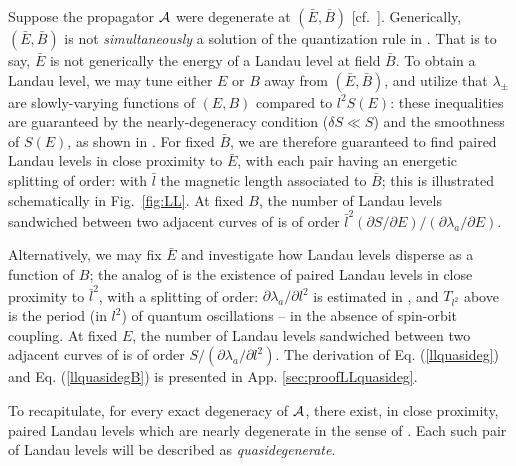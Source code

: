\documentclass[aps, showpacs, twocolumn, notitlepage, superscriptaddress]{revtex4-1}
\begin{document}
Suppose the propagator ${\cal A}$ were degenerate at $(\bar{E},\bar{B})$ [cf.\ ]. Generically, $(\bar{E},\bar{B})$ is not \emph{simultaneously} a solution of the quantization rule in .  
That is to say, $\bar{E}$ is not generically the energy of a Landau level at field $\bar{B}$. To obtain a Landau level, we may tune either $E$ or $B$   away from $(\bar{E},\bar{B})$, and  utilize that  $\lambda_{\pm}$ are slowly-varying functions of $(E,B)$ compared to $l^2S(E)$:
these inequalities are guaranteed by the nearly-degeneracy condition ($\delta S{\ll}S$) and the smoothness of $S(E)$, as shown in .  For fixed $\bar{B}$, we are therefore guaranteed to find paired Landau levels  in close proximity to $\bar{E}$, with each pair having an energetic splitting of order:
with $\bar{l}$ the magnetic length associated to $\bar{B}$; this is illustrated schematically in Fig.\ \ref{fig:LL}. At fixed $B$, the number of Landau levels sandwiched between two adjacent curves of  is of order $\bar{l}^2(\partial S/\partial E)/(\partial \lambda_a/\partial E).$


Alternatively, we may fix $\bar{E}$ and investigate how Landau levels disperse as a function of $B$; the analog of   is the existence of paired Landau levels in close proximity to $\bar{l}^2$, with a splitting of order:
$\partial \lambda_a/\partial l^2$ is estimated in , and
$T_{l^2}$ above is the period (in $l^2$) of quantum oscillations -- in the absence of spin-orbit coupling. At fixed $E$, the number of Landau levels sandwiched between two adjacent curves of  is of order $S/(\partial \lambda_a/\partial l^2).$ The derivation of Eq. (\ref{llquasideg}) and Eq. (\ref{llquasidegB}) is presented in App. \ref{sec:proofLLquasideg}.

To recapitulate, for every exact degeneracy of ${\cal A}$, there exist, in close proximity, paired Landau levels which are  nearly degenerate in the sense of . Each such pair of Landau levels will be described as \textit{quasidegenerate}. 
\end{document}

